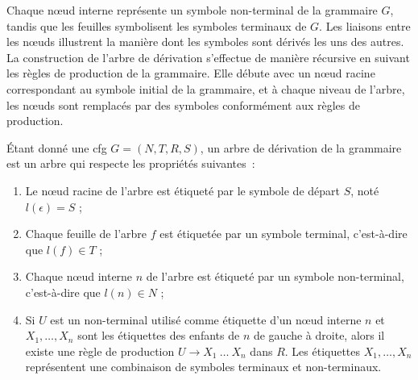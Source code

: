 Chaque nœud interne représente un symbole non-terminal de la grammaire $G$, tandis que les feuilles symbolisent les symboles terminaux de $G$.
Les liaisons entre les nœuds illustrent la manière dont les symboles sont dérivés les uns des autres.
La construction de l'arbre de dérivation s'effectue de manière récursive en suivant les règles de production de la grammaire. Elle débute avec un nœud racine correspondant au symbole initial de la grammaire, et à chaque niveau de l'arbre, les nœuds sont remplacés par des symboles conformément aux règles de production.

\begin{definition}
    Étant donné une \gls{cfg} $G = (N, T, R, S)$, un arbre de dérivation de la grammaire est un arbre qui respecte les propriétés suivantes :
    \begin{enumerate}
        \item Le nœud racine de l'arbre est étiqueté par le symbole de départ $S$, noté $l(\epsilon) = S$ ;
        \item Chaque feuille de l'arbre $f$ est étiquetée par un symbole terminal, c'est-à-dire que $l(f) \in T$ ;
        \item Chaque nœud interne $n$ de l'arbre est étiqueté par un symbole non-terminal, c'est-à-dire que $l(n) \in N$ ;
        \item Si $U$ est un non-terminal utilisé comme étiquette d'un nœud interne $n$ et $X_1, \dots, X_n$ sont les étiquettes des enfants de $n$ de gauche à droite, alors il existe une règle de production $U \to X_1 ~ \dots ~ X_n$ dans $R$.
        Les étiquettes $X_1, \dots, X_n$ représentent une combinaison de symboles terminaux et non-terminaux.
    \end{enumerate}
\end{definition}

